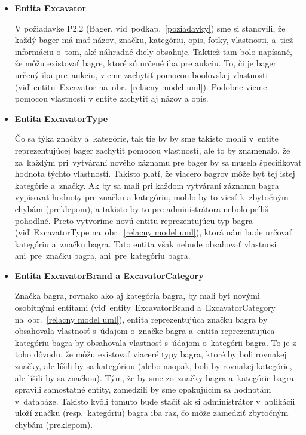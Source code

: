 \begin{itemize}
\item \textbf{Entita Excavator}

V požiadavke P2.2 (Bager, viď~podkap.~\ref{poziadavky}) sme si stanovili, že každý bager má mať názov, značku, kategóriu, opis, fotky, vlastnosti, a~tiež informáciu o~tom, aké náhradné diely obsahuje. Taktiež tam bolo napísané, že môžu existovať bagre, ktoré sú určené iba pre aukciu. To, či je bager určený iba pre~aukciu, vieme zachytiť pomocou boolovskej vlastnosti (viď~entitu~Excavator na~obr.~\ref{relacny model uml}). Podobne vieme pomocou vlastností v entite zachytiť aj názov a opis.

\item \textbf{Entita ExcavatorType}

Čo sa týka značky a~kategórie, tak tie by by sme takisto mohli v~entite reprezentujúcej bager zachytiť pomocou vlastností, ale to by znamenalo, že za~každým pri~vytváraní nového záznamu pre bager by sa musela špecifikovať hodnota týchto vlastností. Takisto platí, že viacero bagrov môže byť tej istej kategórie a~značky. Ak by sa mali pri každom vytváraní záznamu bagra vypisovať hodnoty pre značku a kategóriu, mohlo by to viesť k~zbytočným chybám (preklepom), a takisto by to pre administrátora nebolo príliš pohodlné. Preto vytvoríme novú entitu reprezentujúcu typ bagra (viď~ExcavatorType na~obr.~\ref{relacny model uml}), ktorá nám bude určovať kategóriu a~značku bagra. Tato entita však nebude obsahovať vlastnosi ani~pre~značku bagra, ani~pre~kategóriu bagra.

\item \textbf{Entita ExcavatorBrand a ExcavatorCategory}

Značka bagra, rovnako ako aj kategória bagra, by mali byť novými osobitnými entitami (viď~entity~ExcavatorBrand a~ExcavatorCategory na~obr.~\ref{relacny model uml}), entita reprezentujúca značku bagra by obsahovala vlastnosť s~údajom o~značke bagra a~entita reprezentujúca kategóriu bagra by obsahovala vlastnosť s~údajom o~kategórii bagra. To je z toho dôvodu, že môžu existovať viaceré typy bagra, ktoré by boli rovnakej značky, ale líšili by sa kategóriou (alebo naopak, boli by rovnakej kategórie, ale líšili by sa značkou). Tým, že by sme zo~značky bagra a~kategórie bagra spravili samostatné entity, zamedzili by sme opakujúcim sa hodnotám v~databáze. Takisto kvôli tomuto bude stačiť ak si administrátor v~aplikácii uloží značku (resp.~kategóriu) bagra iba raz, čo môže zamedziť zbytočným chybám (preklepom).


\end{itemize}
